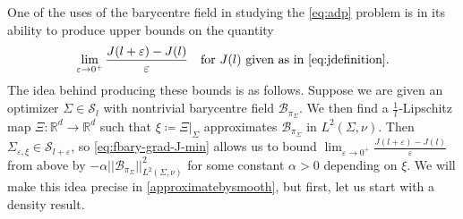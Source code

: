 \documentclass[preprint, reqno]{amsart}
\renewcommand{\epsilon}{\varepsilon}
\theoremstyle{definition}
\numberwithin{equation}{section}
\begin{document}
One of the uses of the barycentre field in studying the \eqref{eq:adp}
problem is in its ability to produce upper bounds on the quantity
\[
  \lim_{\epsilon \to 0^+} \frac{J(l + \epsilon) - J(l)}{\epsilon}
  \quad \hbox{for $J (l)$ given as in \eqref{eq:jdefinition}.}
\]
The idea behind producing these bounds is as follows. Suppose we are
given an optimizer $\Sigma \in \mathcal{S}_l$ with nontrivial
barycentre field $\mathcal{B}_{\pi_{\Sigma}}$. We then find a
$\frac{1}{l}$-Lipschitz map $\Xi: \mathbb{R}^d \to \mathbb{R}^d$ such
that $\xi \coloneqq \Xi|_{\Sigma}$ approximates
$\mathcal{B}_{\pi_{\Sigma}}$ in $L^2(\Sigma, \nu)$. Then
$\Sigma_{\epsilon, \xi} \in \mathcal{S}_{l + \epsilon}$, so
\eqref{eq:fbary-grad-J-min} allows us to bound $\lim_{\epsilon \to
  0^+} \frac{J(l + \epsilon) - J(l)}{\epsilon}$ from above by
$-\alpha||\mathcal{B}_{\pi_{\Sigma}}||^2_{L^2(\Sigma, \nu)}$ for some
constant $\alpha > 0$ depending on $\xi$. We will make this idea
precise in \cref{approximatebysmooth}, but first, let us start with a
density result.
\end{document}
